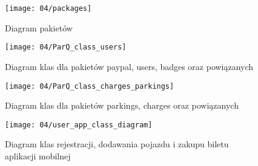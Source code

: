


\begin{figure}[p]
	\begin{center}
		\texttt{[image: 04/packages]}
	\end{center}
	\caption{Diagram pakietów}
\end{figure}




\begin{figure}[p]
	\begin{center}
		\texttt{[image: 04/ParQ\_class\_users]}
	\end{center}
	\caption{Diagram klas dla pakietów paypal, users, badges oraz powiązanych}
\end{figure}


\begin{figure}[p]
	\begin{center}
		\texttt{[image: 04/ParQ\_class\_charges\_parkings]}
	\end{center}
	\caption{Diagram klas dla pakietów parkings, charges oraz powiązanych}
\end{figure}

\begin{figure}[p]
	\begin{center}
		\texttt{[image: 04/user\_app\_class\_diagram]}
	\end{center}
	\caption{Diagram klas rejestracji, dodawania pojazdu i zakupu biletu aplikacji mobilnej}
\end{figure}



